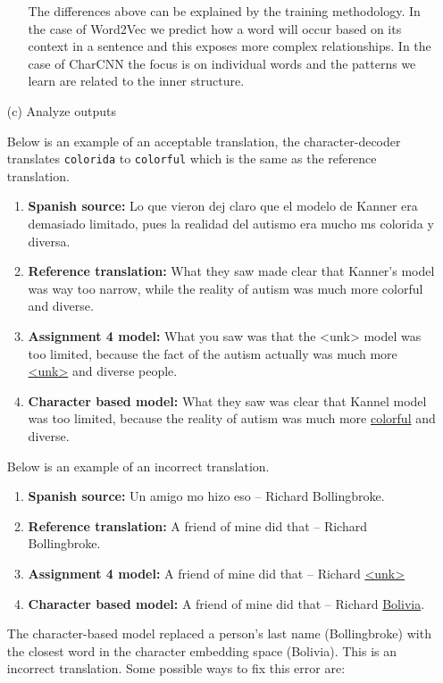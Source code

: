 \documentclass{article}
\begin{document}
\begin{enumerate}
\begin{itemize}
The differences above can be explained by the training methodology. In the case of Word2Vec we predict how a word will occur based on its context in a sentence and this exposes more complex relationships. In the case of CharCNN the focus is on individual words and the patterns we learn are related to the inner structure.
\end{itemize}

\clearpage

\item[(c)]{Analyze outputs}

Below is an example of an acceptable translation, the character-decoder translates \texttt{colorida} to \texttt{colorful} which is the same as the reference translation.

\begin{enumerate}
\item \textbf{Spanish source:} Lo que vieron dej claro que el modelo de Kanner era demasiado limitado, pues la realidad del autismo era mucho ms colorida y diversa.
\item \textbf{Reference translation:} What they saw made clear that Kanner's model was way too narrow,  while the reality of autism was much more colorful and diverse.
\item \textbf{Assignment 4 model:} What you saw was that the <unk> model was too limited, because the fact of the autism actually was much more \underline{<unk>} and diverse people.
\item \textbf{Character based model:}  What they saw was clear that Kannel model was too limited, because the reality of autism was much more \underline{colorful} and diverse.
\end{enumerate}


Below is an example of an incorrect translation.

\begin{enumerate}
\item \textbf{Spanish source:} Un amigo mo hizo eso -- Richard Bollingbroke.
\item \textbf{Reference translation:} A friend of mine did that -- Richard Bollingbroke.
\item \textbf{Assignment 4 model:} A friend of mine did that -- Richard \underline{<unk>}
\item \textbf{Character based model:} A friend of mine did that -- Richard \underline{Bolivia}.
\end{enumerate}

The character-based model replaced a person's last name (Bollingbroke) with the closest word in the character embedding space (Bolivia). This is an incorrect translation. Some  possible ways to fix this error are:


\end{enumerate}
\end{document}
